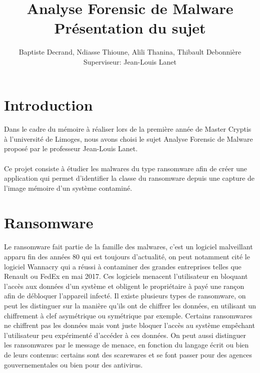 \documentclass[11pt]{article}
\begin{document}
\author{
Baptiste Decrand,						
Ndiasse Thioune,						
Alili Thanina,
Thibault Debonnière
\\[0.5cm]{\small Superviseur: Jean-Louis Lanet}
}

\title{Analyse Forensic de Malware \\Présentation du sujet}
\maketitle
\newpage
\section{Introduction}
\paragraph{}
Dans le cadre du mémoire à réaliser lors de la première année de Master Cryptis à l'université de Limoges, nous avons choisi le sujet Analyse Forensic de Malware proposé par le professeur Jean-Louis Lanet.

\paragraph{}
Ce projet consiste à étudier les malwares du type ransomware afin de créer une application qui permet d'identifier la classe du ransomware depuis une capture de l'image mémoire d'un système contaminé.


\section{Ransomware}
\paragraph{}
Le ransomware fait partie de la famille des malwares, c'est un logiciel malveillant apparu fin des années 80 qui est toujours d'actualité, on peut notamment cité le logiciel Wannacry qui a réussi à contaminer des grandes entreprises telles que Renault ou FedEx en mai 2017. Ces logiciels menacent l'utilisateur en bloquant l'accès aux données d'un système et obligent le propriétaire à payé une rançon afin de débloquer l'appareil infecté.
Il existe plusieurs types de ransomware, on peut les distinguer sur la manière qu'ils ont de chiffrer les données, en utilisant un chiffrement à clef asymétrique ou symétrique par exemple. Certains ransomwares ne chiffrent pas les données mais vont juste bloquer l'accès au système empêchant l'utilisateur peu expérimenté d'accéder à ces données. On peut aussi distinguer les ransomwares par le message de menace, en fonction du langage écrit ou bien de leurs contenus: certains sont des scarewares et se font passer pour des agences gouvernementales ou bien pour des antivirus.
\end{document}
